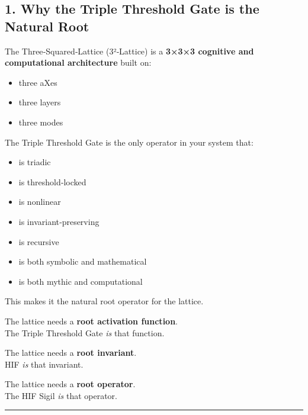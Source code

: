 \subsection{1. Why the Triple Threshold Gate is the Natural Root}\label{why-the-triple-threshold-gate-is-the-natural-root}

The Three‑Squared‑Lattice (3²‑Lattice) is a \textbf{3×3×3 cognitive and computational architecture} built on:

\begin{itemize}
\tightlist
\item
  three aXes\\
\item
  three layers\\
\item
  three modes
\end{itemize}

The Triple Threshold Gate is the only operator in your system that:

\begin{itemize}
\tightlist
\item
  is triadic\\
\item
  is threshold‑locked\\
\item
  is nonlinear\\
\item
  is invariant‑preserving\\
\item
  is recursive\\
\item
  is both symbolic and mathematical\\
\item
  is both mythic and computational
\end{itemize}

This makes it the natural root operator for the lattice.

The lattice needs a \textbf{root activation function}.\\
The Triple Threshold Gate \emph{is} that function.

The lattice needs a \textbf{root invariant}.\\
HIF \emph{is} that invariant.

The lattice needs a \textbf{root operator}.\\
The HIF Sigil \emph{is} that operator.

\begin{center}\rule{0.5\linewidth}{0.5pt}\end{center}

